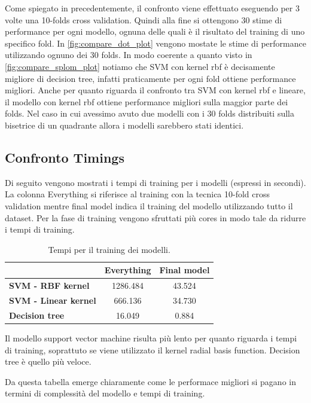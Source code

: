 Come spiegato in precedentemente, il confronto viene effettuato
eseguendo per 3 volte una 10-folds cross validation. Quindi alla fine
si ottengono 30 stime di performance per ogni modello, ognuna delle
quali è il risultato del training di uno specifico fold. In
\autoref{fig:compare_dot_plot} vengono mostate le stime di performance
utilizzando ognuno dei 30 folds. In modo coerente a quanto visto in
\autoref{fig:compare_splom_plot} notiamo che SVM con kernel rbf è
decisamente migliore di decision tree, infatti praticamente per ogni
fold ottiene performance migliori. Anche per quanto riguarda il
confronto tra SVM con kernel rbf e lineare, il modello con kernel rbf
ottiene performance migliori sulla maggior parte dei folds. Nel caso
in cui avessimo avuto due modelli con i 30 folds distribuiti sulla
bisetrice di un quadrante allora i modelli sarebbero stati identici.

\subsection{Confronto Timings}
Di seguito vengono mostrati i tempi di training per i modelli
(espressi in secondi).  La colonna Everything si riferisce al training
con la tecnica 10-fold cross validation mentre final model indica il
training del modello utilizzando tutto il dataset. Per la fase di
training vengono sfruttati più cores in modo tale da ridurre i tempi
di training.

\begin{table}[H]
	\begin{center}
		\begin{tabular}{ | l | c | c |}
			\hline
			& \textbf{Everything} & \textbf{Final model} \\
			\hline
			\textbf{SVM - RBF kernel} & 1286.484  & 43.524 \\
			\textbf{SVM - Linear kernel} & 666.136 & 34.730 \\
			\textbf{Decision tree} & 16.049 & 0.884  \\
			\hline
		\end{tabular}
	\end{center}
	\caption{Tempi per il training dei modelli.}
\end{table}

Il modello support vector machine risulta più lento per quanto
riguarda i tempi di training, soprattuto se viene utilizzato il kernel
radial basis function. Decision tree è quello più veloce.

Da questa tabella emerge chiaramente come le performace migliori si
pagano in termini di complessità del modello e tempi di training.
